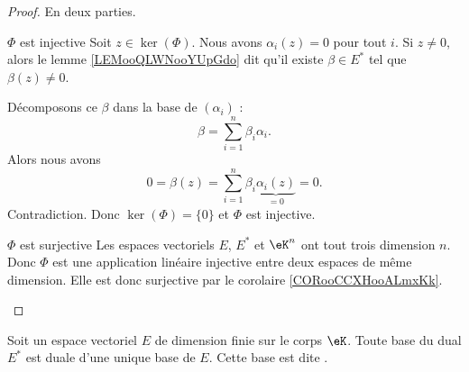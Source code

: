 \begin{proof}
    En deux parties.
    \begin{subproof}
        \item[\( \Phi\) est injective]
            Soit \( z\in \ker(\Phi)\). Nous avons \( \alpha_i(z)=0\) pour tout \( i\). Si \( z\neq 0\), alors le lemme \ref{LEMooQLWNooYUpGdo} dit qu'il existe \( \beta\in E^*\) tel que \( \beta(z)\neq 0\).

    Décomposons ce \( \beta\) dans la base de \( (\alpha_i)\) :
    \begin{equation}
        \beta=\sum_{i=1}^n\beta_i\alpha_i.
    \end{equation}
    Alors nous avons
    \begin{equation}
        0=\beta(z)=\sum_{i=1}^n\beta_i\underbrace{\alpha_i(z)}_{=0}=0.
    \end{equation}
    Contradiction. Donc \( \ker(\Phi)=\{ 0 \}\) et \( \Phi\) est injective.

\item[\( \Phi\) est surjective]
    Les espaces vectoriels \( E\), \( E^*\) et \( \eK^n\) ont tout trois dimension \( n\). Donc \( \Phi\) est une application linéaire injective entre deux espaces de même dimension. Elle est donc surjective par le corolaire \ref{CORooCCXHooALmxKk}.
    \end{subproof}
\end{proof}


\begin{propositionDef}       \label{PROPooDBPGooPagbEB}
    Soit un espace vectoriel \( E\) de dimension finie sur le corps \( \eK\). Toute base du dual \( E^*\) est duale d'une unique base de \( E\). Cette base est dite .
\end{propositionDef}

